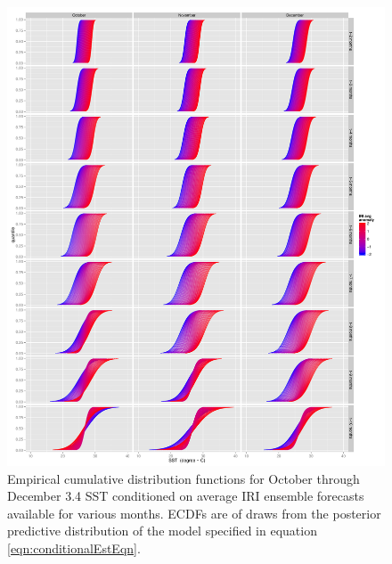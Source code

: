 \documentclass[article]{jss}
\begin{document}
\begin{figure}[!htbp]
  \begin{center}
    \includegraphics[width=\linewidth, keepaspectratio]{img/conditionalCDFs10to12TraditionalCDFconfig.pdf}
    \caption{Empirical cumulative distribution functions for October through December  3.4 SST conditioned on average IRI ensemble forecasts available for various months. ECDFs are of draws from the posterior predictive distribution of the model specified in equation \ref{eqn:conditionalEstEqn}.}
     \label{fig:conditionalCDFs10to12}
   \end{center}
\end{figure}
\end{document}
